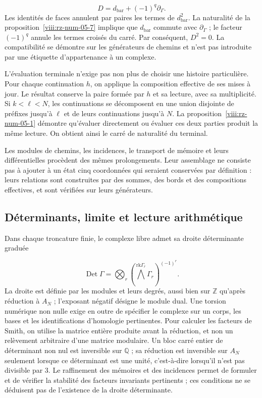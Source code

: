 \[
D=d_{\mathrm{bar}}+(-1)^q\partial_\Gamma.
\]
Les identités de faces annulent par paires les termes de \(d_{\mathrm{bar}}^2\). La naturalité de la proposition~\ref{viii:rz-num-05-7} implique que \(d_{\mathrm{bar}}\) commute avec \(\partial_\Gamma\) ; le facteur \((-1)^q\) annule les termes croisés du carré. Par conséquent, \(D^2=0\). La compatibilité se démontre sur les générateurs de chemins et n'est pas introduite par une étiquette d'appartenance à un complexe.

L'évaluation terminale n'exige pas non plus de choisir une histoire particulière. Pour chaque continuation \(h\), on applique la composition effective de ses mises à jour. Le résultat conserve la paire formée par \(h\) et sa lecture, avec sa multiplicité. Si \(k<\ell<N\), les continuations se décomposent en une union disjointe de préfixes jusqu'à \(\ell\) et de leurs continuations jusqu'à \(N\). La proposition~\ref{viii:rz-num-05-1} démontre qu'évaluer directement ou évaluer ces deux parties produit la même lecture. On obtient ainsi le carré de naturalité du terminal.

Les modules de chemins, les incidences, le transport de mémoire et leurs différentielles procèdent des mêmes prolongements. Leur assemblage ne consiste pas à ajouter à un état cinq coordonnées qui seraient conservées par définition : leurs relations sont construites par des sommes, des bords et des compositions effectives, et sont vérifiées sur leurs générateurs.

\subsection{Déterminants, limite et lecture arithmétique}
Dans chaque troncature finie, le complexe libre admet sa droite déterminante graduée

\[
\operatorname{Det}\Gamma=
\bigotimes_r\left(\bigwedge^{\mathrm{rk}\Gamma_r}\Gamma_r\right)^{(-1)^r}.
\]
La droite est définie par les modules et leurs degrés, aussi bien sur \(\mathbb Z\) qu'après réduction à \(A_N\) ; l'exposant négatif désigne le module dual. Une torsion numérique non nulle exige en outre de spécifier le complexe sur un corps, les bases et les identifications d'homologie pertinentes. Pour calculer les facteurs de Smith, on utilise la matrice entière produite avant la réduction, et non un relèvement arbitraire d'une matrice modulaire. Un bloc carré entier de déterminant non nul est inversible sur \(\mathbb Q\) ; sa réduction est inversible sur \(A_N\) seulement lorsque ce déterminant est une unité, c'est-à-dire lorsqu'il n'est pas divisible par \(3\). Le raffinement des mémoires et des incidences permet de formuler et de vérifier la stabilité des facteurs invariants pertinents ; ces conditions ne se déduisent pas de l'existence de la droite déterminante.

